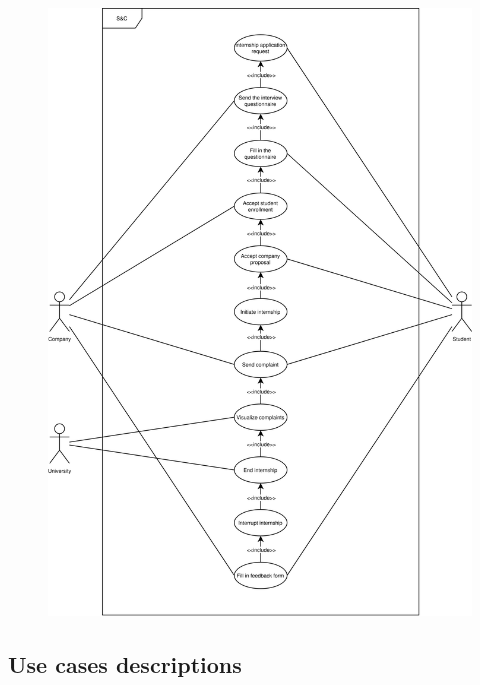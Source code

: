 \begin{figure}[H]
    \centering
    \includegraphics[width=0.8\linewidth]{../assets/use-case-diagrams/internship-iter.png}
\end{figure}

\subsection{Use cases descriptions}

